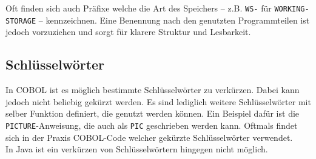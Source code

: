 Oft finden sich auch Präfixe welche die Art des Speichers -- z.B. \texttt{WS-} für \texttt{WORKING-STORAGE} -- kennzeichnen. Eine Benennung nach den genutzten Programmteilen ist jedoch vorzuziehen und sorgt für klarere Struktur und Lesbarkeit.

\subsection*{Schlüsselwörter}
In COBOL ist es möglich bestimmte Schlüsselwörter zu verkürzen. Dabei kann jedoch nicht beliebig gekürzt werden. Es sind lediglich weitere Schlüsselwörter mit selber Funktion definiert, die genutzt werden können. Ein Beispiel dafür ist die \texttt{PICTURE}-Anweisung, die auch als \texttt{PIC} geschrieben werden kann. Oftmals findet sich in der Praxis COBOL-Code welcher gekürzte Schlüsselwörter verwendet.\\

In Java ist ein verkürzen von Schlüsselwörtern hingegen nicht möglich.

